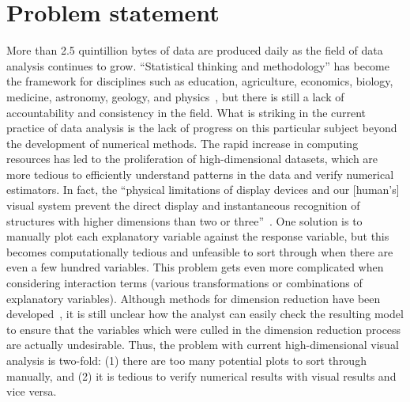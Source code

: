 \section{Problem statement}
\label{sec:intro:problem}

More than 2.5 quintillion bytes of data are produced daily as the field of data
analysis continues to grow. ``Statistical thinking and methodology'' has become
the framework for disciplines such as education, agriculture, economics,
biology, medicine, astronomy, geology, and physics~\cite{efron1986}, but there
is still a lack of accountability and consistency in the field. What is striking
in the current practice of data analysis is the lack of progress on this
particular subject beyond the development of numerical methods. The rapid
increase in computing resources has led to the proliferation of high-dimensional
datasets, which are more tedious to efficiently understand patterns in the data
and verify numerical estimators. In fact, the ``physical limitations of display
devices and our [human's] visual system prevent the direct display and
instantaneous recognition of structures with higher dimensions than two
or three''~\cite{lius2016}. One solution is to manually plot
each explanatory variable against the response variable, but this becomes
computationally tedious and unfeasible to sort through when there are even a few
hundred variables. This problem gets even more complicated when considering
interaction terms (various transformations or combinations of explanatory
variables). Although methods for dimension reduction have been
developed~\cite{lius2016}, it is still unclear how the analyst can easily check
the resulting model to ensure that the variables which were culled in the
dimension reduction process are actually undesirable. Thus, the problem with
current high-dimensional visual analysis is two-fold: (1) there are too many
potential plots to sort through manually, and (2) it is tedious to verify
numerical results with visual results and vice versa. 


